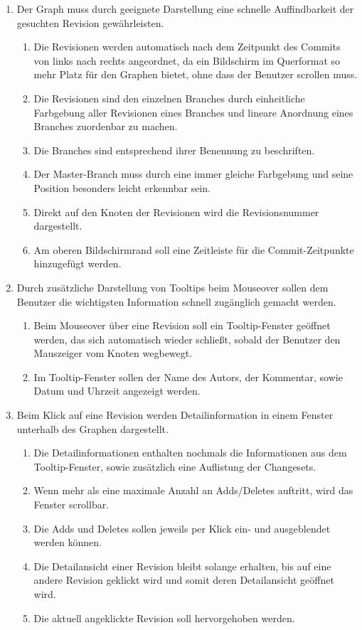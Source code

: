 \documentclass[nocolor]{tudbook}
\begin{document}
\begin{enumerate}[F1]
\item Der Graph muss durch geeignete Darstellung eine schnelle Auffindbarkeit der gesuchten Revision gewährleisten.
	\begin{enumerate}[{F1}.1]
	\item Die Revisionen werden automatisch nach dem Zeitpunkt des Commits von links nach rechts angeordnet, da ein Bildschirm im Querformat so mehr Platz für den Graphen bietet, ohne dass der Benutzer scrollen muss.
	\item Die Revisionen sind den einzelnen Branches durch einheitliche Farbgebung aller Revisionen eines Branches und lineare Anordnung eines Branches zuordenbar zu machen.
	\item Die Branches sind entsprechend ihrer Benennung zu beschriften.
	\item Der Master-Branch muss durch eine immer gleiche Farbgebung und seine Position besonders leicht erkennbar sein.
	\item Direkt auf den Knoten der Revisionen wird die Revisionsnummer dargestellt.
	\item Am oberen Bildschirmrand soll eine Zeitleiste für die Commit-Zeitpunkte hinzugefügt werden.
	\end{enumerate}
\item Durch zusätzliche Darstellung von Tooltips beim Mouseover sollen dem Benutzer die wichtigsten Information schnell zugänglich gemacht werden.
	\begin{enumerate}[{F2}.1]	
	\item Beim Mouseover über eine Revision soll ein Tooltip-Fenster geöffnet werden, das sich automatisch wieder schließt, sobald der Benutzer den Mauszeiger vom Knoten wegbewegt.
	\item Im Tooltip-Fenster sollen der Name des Autors, der Kommentar, sowie Datum und Uhrzeit angezeigt werden.
	\end{enumerate}
\item Beim Klick auf eine Revision werden Detailinformation in einem Fenster unterhalb des Graphen dargestellt.
	\begin{enumerate}[{F3}.1]	
	\item Die Detailinformationen enthalten nochmals die Informationen aus dem Tooltip-Fenster, sowie zusätzlich eine Auflistung der Changesets.
	\item Wenn mehr als eine maximale Anzahl an Adds/Deletes auftritt, wird das Fenster scrollbar.
	\item Die Adds und Deletes sollen jeweils per Klick ein- und ausgeblendet werden können.
	\item Die Detailansicht einer Revision bleibt solange erhalten, bis auf eine andere Revision geklickt wird und somit deren Detailansicht geöffnet wird.
	\item Die aktuell angeklickte Revision soll hervorgehoben werden.
	\end{enumerate}
\end{enumerate}
\end{document}
